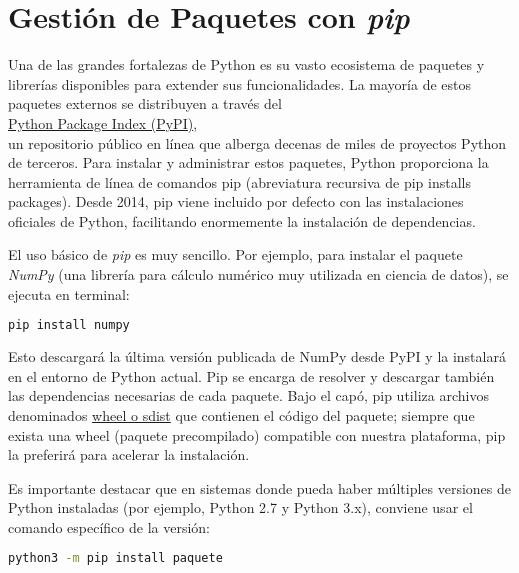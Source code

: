 \section{Gestión de Paquetes con \textit{pip}}

Una de las grandes fortalezas de Python es su vasto ecosistema de paquetes y 
librerías disponibles para extender sus funcionalidades. La mayoría de estos 
paquetes externos se distribuyen a través del 
\\
\href{https://pypi.org/}{Python Package Index (PyPI)},
\\

un repositorio público en línea que alberga decenas de miles de proyectos Python 
de terceros. Para instalar y administrar estos paquetes, Python proporciona 
la herramienta de línea de comandos pip (abreviatura recursiva de 
pip installs packages). Desde 2014, pip viene incluido por defecto con las 
instalaciones oficiales de Python, 
facilitando enormemente la instalación de dependencias.


El uso básico de \textit{pip} es muy sencillo. Por ejemplo, para instalar el paquete 
\textit{NumPy} (una librería para cálculo numérico muy utilizada en ciencia de datos), 
se ejecuta en terminal:

\begin{lstlisting}[language=bash, caption={Instalación con pip}]
pip install numpy 
\end{lstlisting}

Esto descargará la última versión publicada de NumPy desde PyPI y la instalará 
en el entorno de Python actual. Pip se encarga de resolver y descargar también 
las dependencias necesarias de cada paquete. Bajo el capó, pip utiliza archivos 
denominados \href{https://pip.pypa.io/en/stable/cli/pip_wheel/}{wheel o sdist} 
que contienen el código del paquete; siempre que exista
una wheel (paquete precompilado) compatible con nuestra plataforma, 
pip la preferirá para acelerar la instalación.

Es importante destacar que en sistemas donde pueda haber múltiples versiones 
de Python instaladas (por ejemplo, Python 2.7 y Python 3.x), conviene usar 
el comando específico de la versión:

\begin{lstlisting}[language=bash, caption={Uso explícito de la versión de Python}]
python3 -m pip install paquete
\end{lstlisting}

